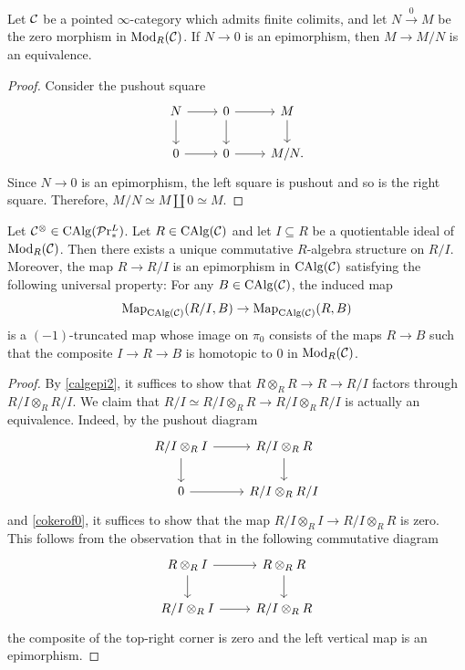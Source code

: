 \documentclass[10pt,a4paper,oneside]{article}
\begin{document}
\begin{lem}\label{cokerof0}
Let $\mathcal{C}$ be a pointed $\infty$-category which admits finite colimits, and let $N\xrightarrow{0} M$ be the zero morphism in  $\operatorname{Mod}_R(\mathcal{C})$. If $N\to 0$ is an epimorphism, then $M\to M/N$ is an equivalence.
\end{lem}

\begin{proof}
Consider the pushout square
$$
\begin{tikzcd}
N \arrow[d] \arrow[r] & 0 \arrow[d] \arrow[r] & M \arrow[d] \\
0 \arrow[r]           & 0 \arrow[r]           & M/N.
\end{tikzcd}$$
Since $N\to 0$ is an epimorphism, the left square is pushout and so is the right square. Therefore, $M/N \simeq M \coprod 0 \simeq M$.
\end{proof}

\begin{thm}\label{quotidl}
Let $\mathcal{C}^\otimes\in\operatorname{CAlg}(\mathcal{P}\mathrm{r}^L_*)$. Let $R\in\operatorname{CAlg}(\mathcal{C})$ and let $I\subseteq R$ be a quotientable ideal of $\operatorname{Mod}_{R}(\mathcal{C})$. Then there exists a unique commutative $R$-algebra structure on $R/I$. Moreover, the map $R\to R/I$ is an epimorphism in $\operatorname{CAlg}(\mathcal{C})$ satisfying the following universal property: For any $B\in \operatorname{CAlg}(\mathcal{C})$, the induced map $$\operatorname{Map}_{\operatorname{CAlg}(\mathcal{C})}(R/I,B)\to \operatorname{Map}_{\operatorname{CAlg}(\mathcal{C})}(R,B)$$ is a $(-1)$-truncated map whose image on $\pi_0$ consists of the maps $R\to B$ such that the composite $I\to R\to B$ is homotopic to $0$ in $\operatorname{Mod}_R(\mathcal{C})$.
\end{thm}

\begin{proof}
By \cref{calgepi2}, it suffices to show that $R\otimes_RR \to R\to R/I$ factors through $R/I\otimes_R R/I$. We claim that $R/I \simeq R/I\otimes_RR\to R/I\otimes_R R/I$ is actually an equivalence. Indeed, by the pushout diagram
$$
\begin{tikzcd}
R/I\otimes_RI \arrow[d] \arrow[r] & R/I\otimes_RR \arrow[d] \\
0 \arrow[r]         & R/I\otimes_RR/I      
\end{tikzcd}$$
and \cref{cokerof0}, it suffices to show that the map $R/I\otimes_RI \to R/I\otimes_RR$ is zero. This follows from the observation that in the following commutative diagram $$%
\begin{tikzcd}
R\otimes_RI \arrow[d] \arrow[r] & R\otimes_RR \arrow[d] \\
R/I\otimes_RI \arrow[r]         & R/I\otimes_RR        
\end{tikzcd}$$
the composite of the top-right corner is zero and the left vertical map is an epimorphism.
\end{proof}
\end{document}
